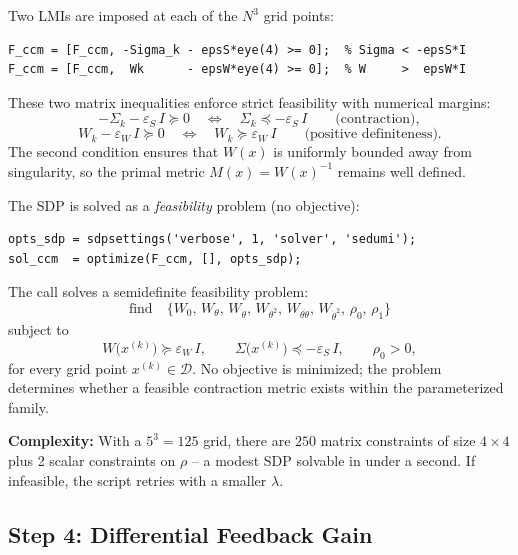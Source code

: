\documentclass[11pt,a4paper]{article}
\begin{document}
Two LMIs are imposed at each of the \(N^3\) grid points:

\begin{lstlisting}
F_ccm = [F_ccm, -Sigma_k - epsS*eye(4) >= 0];  % Sigma < -epsS*I
F_ccm = [F_ccm,  Wk      - epsW*eye(4) >= 0];  % W     >  epsW*I
\end{lstlisting}

\begin{codemath}
These two matrix inequalities enforce strict feasibility with numerical margins:
\[
-\Sigma_k - \varepsilon_S\, I \succeq 0
\quad\Longleftrightarrow\quad
\Sigma_k \preceq -\varepsilon_S\, I
\qquad\text{(contraction)},
\]
\[
W_k - \varepsilon_W\, I \succeq 0
\quad\Longleftrightarrow\quad
W_k \succeq \varepsilon_W\, I
\qquad\text{(positive definiteness)}.
\]
The second condition ensures that \(W(x)\) is uniformly bounded away from singularity, so the primal metric \(M(x) = W(x)^{-1}\) remains well defined.
\end{codemath}

The SDP is solved as a \emph{feasibility} problem (no objective):

\begin{lstlisting}
opts_sdp = sdpsettings('verbose', 1, 'solver', 'sedumi');
sol_ccm  = optimize(F_ccm, [], opts_sdp);
\end{lstlisting}

\begin{codemath}
The call solves a semidefinite feasibility problem:
\[
\text{find}\quad
\bigl\{W_0,\,W_\theta,\,W_{\dot\theta},\,W_{\theta^2},\,W_{\theta\dot\theta},\,W_{\dot\theta^2},\,\rho_0,\,\rho_1\bigr\}
\]
subject to
\[
W\!\bigl(x^{(k)}\bigr) \succeq \varepsilon_W\, I,
\qquad
\Sigma\!\bigl(x^{(k)}\bigr) \preceq -\varepsilon_S\, I,
\qquad
\rho_0 > 0,
\]
for every grid point \(x^{(k)} \in \mathcal{D}\). No objective is minimized; the problem determines whether a feasible contraction metric exists within the parameterized family.
\end{codemath}

\textbf{Complexity:} With a \(5^3 = 125\) grid, there are \(250\) matrix constraints of size \(4 \times 4\) plus 2 scalar constraints on \(\rho\) -- a modest SDP solvable in under a second.  If infeasible, the script retries with a smaller \(\lambda\).

\subsection{Step 4: Differential Feedback Gain}
\end{document}
